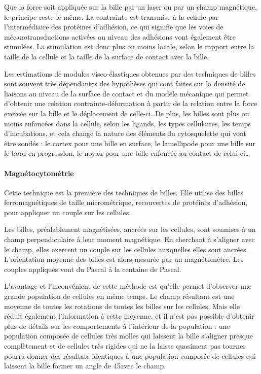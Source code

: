 \documentclass{report}
\begin{document}
Que la force soit appliquée sur la bille par un laser ou par un champ magnétique, le principe reste le même. La contrainte est transmise à la cellule par l'intermédiaire des protéines d'adhésion, ce qui signifie que les voies de mécanotransductions activées au niveau des adhésions vont également être stimulées. 
La stimulation est donc plus ou moins locale, selon le rapport entre la taille de la cellule et la taille de la surface de contact avec la bille.

Les estimations de modules visco-élastiques obtenues par des techniques de billes sont souvent très dépendantes des hypothèses qui sont faites sur la densité de liaisons au niveau de la surface de contact et du modèle mécanique qui permet d'obtenir une relation contrainte-déformation à partir de la relation entre la force exercée sur la bille et le déplacement de celle-ci. 
De plus, les billes sont plus ou moins enfoncées dans la cellule, selon les ligands, les types cellulaires, les temps d'incubations, et cela change la nature des éléments du cytosquelette qui vont être sondés : le cortex pour une bille en surface, le lamellipode pour une bille sur le bord en progression, le noyau pour une bille enfoncée au contact de celui-ci\dots


\paragraph{Magnétocytométrie}

Cette technique est la première des techniques de billes. Elle utilise des billes ferromagnétiques de taille micrométrique, recouvertes de protéines d'adhésion, pour appliquer un couple sur les cellules. 

Les billes, préalablement magnétisées, ancrées sur les cellules, sont soumises à un champ perpendiculaire à leur moment magnétique. En cherchant à s'aligner avec le champ, elles exercent un couple sur les cellules auxquelles elles sont ancrées. L'orientation moyenne des billes est alors mesurée par un magnétomètre. Les couples appliqués vont du Pascal à la centaine de Pascal. 

L'avantage et l'inconvénient de cette méthode est qu'elle permet d'observer une grande population de cellules en même temps. Le champ résultant est une moyenne de toutes les rotations de toutes les billes sur les cellules. Mais elle réduit également l'information à cette moyenne, et il n'est pas possible d'obtenir plus de détails sur les comportements à l'intérieur de la population : une population composée de cellules très molles qui laissent la bille s'aligner presque complètement et de cellules très rigides qui ne la laisse quasiment pas tourner pourra donner des résultats identiques à une population composée de cellules qui laissent la bille former un angle de 45\degres avec le champ. 
\end{document}
